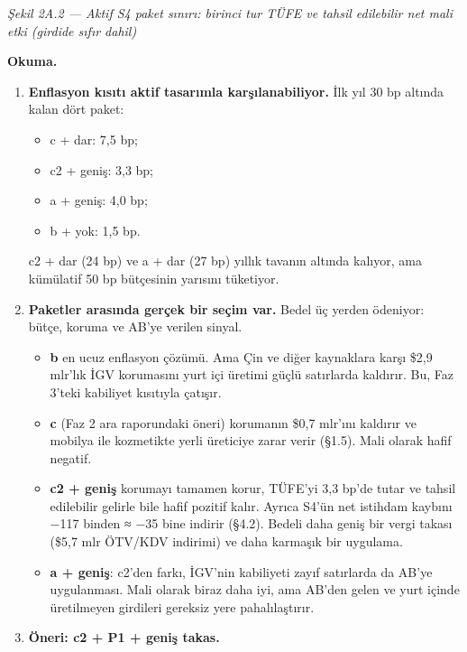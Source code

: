 \emph{Şekil 2A.2 --- Aktif S4 paket sınırı: birinci tur TÜFE ve tahsil edilebilir net mali etki (girdide sıfır dahil)}

\textbf{Okuma.}

\begin{enumerate}
\def\labelenumi{\arabic{enumi}.}
\item
  \textbf{Enflasyon kısıtı aktif tasarımla karşılanabiliyor.} İlk yıl 30 bp altında kalan dört paket:

  \begin{itemize}
  \tightlist
  \item
    c + dar: 7,5 bp;
  \item
    c2 + geniş: 3,3 bp;
  \item
    a + geniş: 4,0 bp;
  \item
    b + yok: 1,5 bp.
  \end{itemize}

  c2 + dar (24 bp) ve a + dar (27 bp) yıllık tavanın altında kalıyor, ama kümülatif 50 bp bütçesinin yarısını tüketiyor.
\item
  \textbf{Paketler arasında gerçek bir seçim var.} Bedel üç yerden ödeniyor: bütçe, koruma ve AB'ye verilen sinyal.

  \begin{itemize}
  \tightlist
  \item
    \textbf{b} en ucuz enflasyon çözümü. Ama Çin ve diğer kaynaklara karşı \$2,9 mlr'lık İGV korumasını yurt içi üretimi güçlü satırlarda kaldırır. Bu, Faz 3'teki kabiliyet kısıtıyla çatışır.
  \item
    \textbf{c} (Faz 2 ara raporundaki öneri) korumanın \$0,7 mlr'ını kaldırır ve mobilya ile kozmetikte yerli üreticiye zarar verir (§1.5). Mali olarak hafif negatif.
  \item
    \textbf{c2 + geniş} korumayı tamamen korur, TÜFE'yi 3,3 bp'de tutar ve tahsil edilebilir gelirle bile hafif pozitif kalır. Ayrıca S4'ün net istihdam kaybını −117 binden ≈ −35 bine indirir (§4.2). Bedeli daha geniş bir vergi takası (\$5,7 mlr ÖTV/KDV indirimi) ve daha karmaşık bir uygulama.
  \item
    \textbf{a + geniş}: c2'den farkı, İGV'nin kabiliyeti zayıf satırlarda da AB'ye uygulanması. Mali olarak biraz daha iyi, ama AB'den gelen ve yurt içinde üretilmeyen girdileri gereksiz yere pahalılaştırır.
  \end{itemize}
\item
  \textbf{Öneri: c2 + P1 + geniş takas.}


\end{enumerate}
